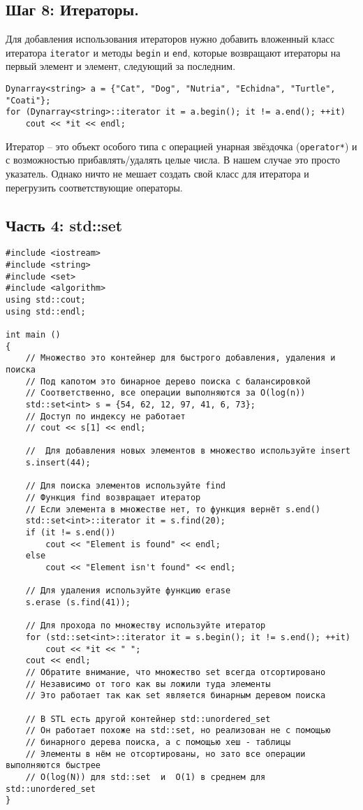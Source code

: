 \documentclass{article}
\begin{document}
\subsection*{Шаг 8: Итераторы.}
Для добавления использования итераторов нужно добавить вложенный класс итератора \texttt{iterator} и методы \texttt{begin} и \texttt{end}, которые возвращают итераторы на первый элемент и элемент, следующий за последним.
\begin{lstlisting}
Dynarray<string> a = {"Cat", "Dog", "Nutria", "Echidna", "Turtle", "Coati"};
for (Dynarray<string>::iterator it = a.begin(); it != a.end(); ++it)
	cout << *it << endl;
\end{lstlisting}
Итератор -- это объект особого типа с операцией унарная звёздочка (\texttt{operator*}) и с возможностью прибавлять/удалять целые числа. В нашем случае это просто указатель. Однако ничто не мешает создать свой класс для итератора и перегрузить соответствующие операторы.


\iffalse
\newpage
\subsection*{Часть 4: std::set}
\begin{lstlisting}
#include <iostream>
#include <string>
#include <set>
#include <algorithm>
using std::cout;
using std::endl;

int main () 
{
    // Множество это контейнер для быстрого добавления, удаления и поиска
    // Под капотом это бинарное дерево поиска с балансировкой
    // Соответственно, все операции выполняются за O(log(n))
    std::set<int> s = {54, 62, 12, 97, 41, 6, 73};
    // Доступ по индексу не работает
    // cout << s[1] << endl;
    
    //  Для добавления новых элементов в множество используйте insert
    s.insert(44);
    
    // Для поиска элементов используйте find
    // Функция find возвращает итератор
    // Если элемента в множестве нет, то функция вернёт s.end()
    std::set<int>::iterator it = s.find(20);
    if (it != s.end())
        cout << "Element is found" << endl;
    else
        cout << "Element isn't found" << endl;
		
    // Для удаления используйте функцию erase
    s.erase (s.find(41));

    // Для прохода по множеству используйте итератор
    for (std::set<int>::iterator it = s.begin(); it != s.end(); ++it)
        cout << *it << " ";
    cout << endl;
    // Обратите внимание, что множество set всегда отсортировано
    // Независимо от того как вы ложили туда элементы
    // Это работает так как set является бинарным деревом поиска
    
    // В STL есть другой контейнер std::unordered_set
    // Он работает похоже на std::set, но реализован не с помощью
    // бинарного дерева поиска, а с помощью хеш - таблицы
    // Элементы в нём не отсортированы, но зато все операции выполняются быстрее
    // O(log(N)) для std::set  и  O(1) в среднем для std::unordered_set
}
\end{lstlisting}
\end{document}
